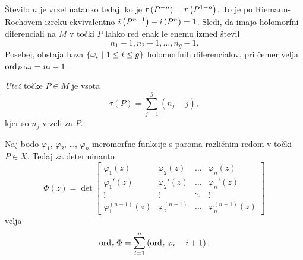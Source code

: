Število $n$ je vrzel natanko tedaj, ko je
$r \left(P^{-n}\right) = r \left(P^{1-n}\right)$. To je po Riemann-Rochovem izreku
ekvivalentno $i \left(P^{n-1}\right) - i \left(P^n\right) = 1$. Sledi, da imajo
holomorfni diferenciali na $M$ v točki $P$ lahko red enak le enemu
izmed števil
\[
n_1 - 1, n_2 - 1, \dots, n_g - 1.
\]
Posebej, obstaja baza $\left\{\omega_i~\middle\vert~1 \leq i \leq g\right\}$
holomorfnih diferencialov, pri čemer velja
$\operatorname{ord}_P \omega_i = n_i - 1$.

\begin{definicija}
\emph{Utež} točke $P \in M$ je vsota
\[
\tau(P) = \sum_{j=1}^g (n_j - j),
\]
kjer so $n_j$ vrzeli za $P$.
\end{definicija}

\begin{lema}
Naj bodo $\varphi_1$, $\varphi_2$, \dots, $\varphi_n$ meromorfne
funkcije s paroma različnim redom v točki $P \in X$. Tedaj za
determinanto
\[
\Phi(z) = \det
\begin{bmatrix}
\varphi_1(z)    & \varphi_2(z)  & \dots  & \varphi_n(z)  \\
\varphi_1'(z)   & \varphi_2'(z) & \dots  & \varphi_n'(z) \\
\vdots          & \vdots        & \ddots & \vdots        \\
\varphi_1^{(n-1)}(z)            & \varphi_2^{(n-1)}      &
\dots                           & \varphi_n^{(n-1)}(z)
\end{bmatrix}
\]
velja
\[
\operatorname{ord}_z \Phi = \sum_{i=1}^n \left(\operatorname{ord}_z \varphi_i - i + 1\right).
\]
\end{lema}

